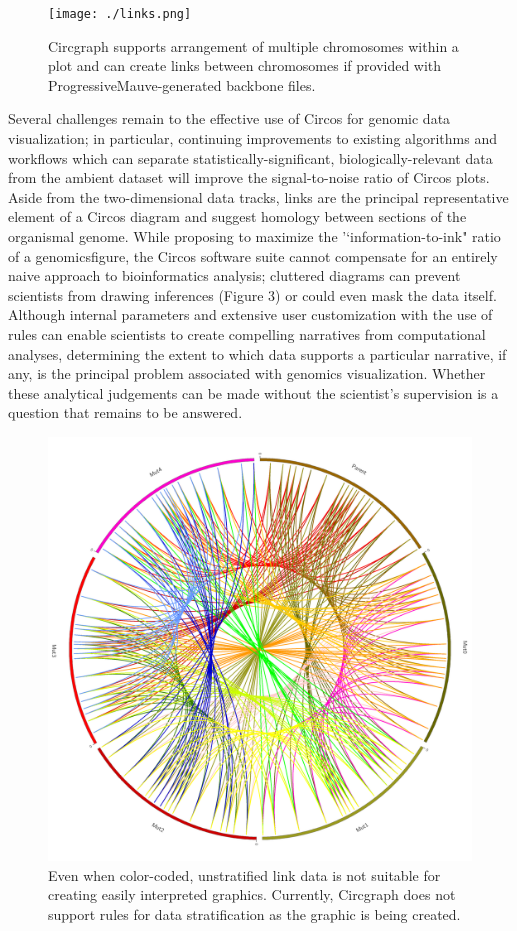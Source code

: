 \documentclass{article}
\begin{document}
\begin{figure}
\centering
\texttt{[image: ./links.png]}
\caption{Circgraph supports arrangement of multiple chromosomes within a plot and can create links between chromosomes if provided with ProgressiveMauve-generated backbone files.}
\end{figure}

Several challenges remain to the effective use of Circos for genomic data visualization; in particular, continuing improvements to existing algorithms and workflows which can separate statistically-significant, biologically-relevant data from the ambient dataset will improve the signal-to-noise ratio of Circos plots. Aside from the two-dimensional data tracks, links are the principal representative element of a Circos diagram and suggest homology between sections of the organismal genome. While proposing to maximize the '`information-to-ink" ratio of a genomicsfigure, the Circos software suite cannot compensate for an entirely naive approach to bioinformatics analysis; cluttered diagrams can prevent scientists from drawing inferences (Figure 3) or could even mask the data itself. Although internal parameters and extensive user customization with the use of rules can enable scientists to create compelling narratives from computational analyses, determining the extent to which data supports a particular narrative, if any, is the principal problem associated with genomics visualization. Whether these analytical judgements can be made without the scientist's supervision is a question that remains to be answered.

\begin{figure}
\centering
\includegraphics[scale=0.1]{./Generated_Data_Non_Ribbon.png}
\caption{Even when color-coded, unstratified link data is not suitable for creating easily interpreted graphics. Currently, Circgraph does not support rules for data stratification as the graphic is being created.}
\end{figure}
\end{document}
